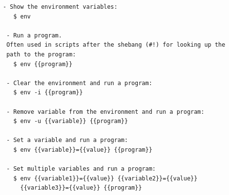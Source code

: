 \documentclass[a4paper,12pt]{article}
\begin{document}
\begin{verbatim}
      - Show the environment variables:
         $ env

       - Run a program. 
       Often used in scripts after the shebang (#!) for looking up the
       path to the program:
         $ env {{program}}

       - Clear the environment and run a program:
         $ env -i {{program}}

       - Remove variable from the environment and run a program:
         $ env -u {{variable}} {{program}}

       - Set a variable and run a program:
         $ env {{variable}}={{value}} {{program}}

       - Set multiple variables and run a program:
         $ env {{variable1}}={{value}} {{variable2}}={{value}} 
           {{variable3}}={{value}} {{program}}

\end{verbatim}
\end{document}
